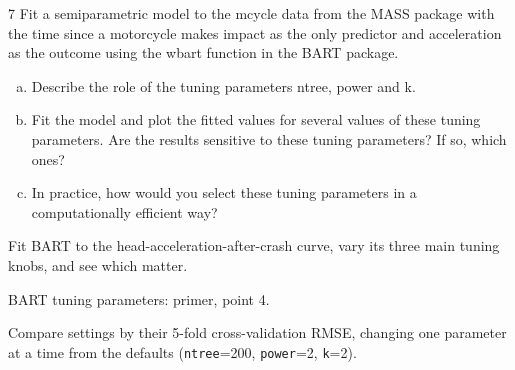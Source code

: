 \documentclass[11pt]{article}
\begin{document}
\begin{problem}{7}
Fit a semiparametric model to the mcycle data from the MASS package with the time since a motorcycle makes impact as the only predictor and acceleration as the outcome using the wbart function in the BART package.
\begin{enumerate}[(a)]
\item Describe the role of the tuning parameters ntree, power and k.
\item Fit the model and plot the fitted values for several values of these tuning parameters. Are the results sensitive to these tuning parameters? If so, which ones?
\item In practice, how would you select these tuning parameters in a computationally efficient way?
\end{enumerate}
\end{problem}

\begin{restate}
Fit BART to the head-acceleration-after-crash curve, vary its three main tuning knobs, and see which matter.
\end{restate}

\begin{recall}
BART tuning parameters: primer, point 4.
\end{recall}

\begin{keyidea}
Compare settings by their 5-fold cross-validation RMSE, changing one parameter at a time from the defaults (\texttt{ntree}=200, \texttt{power}=2, \texttt{k}=2).
\end{keyidea}
\end{document}
